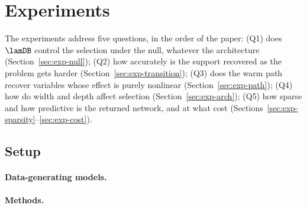 \section{Experiments}\label{sct:exp}

The experiments address five questions, in the order of the paper:
(Q1) does $\lamDB$ control the selection under the null, whatever the
architecture (Section~\ref{sec:exp-null});
(Q2) how accurately is the support recovered as the problem gets harder
(Section~\ref{sec:exp-transition});
(Q3) does the warm path recover variables whose effect is purely nonlinear
(Section~\ref{sec:exp-path});
(Q4) how do width and depth affect selection (Section~\ref{sec:exp-arch});
(Q5) how sparse and how predictive is the returned network, and at what cost
(Sections~\ref{sec:exp-sparsity}--\ref{sec:exp-cost}).

\subsection{Setup}\label{sec:exp-setup}

\paragraph{Data-generating models.}

\paragraph{Methods.}

